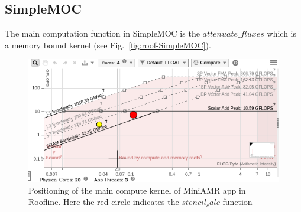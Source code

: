 \subsection{SimpleMOC}
The main computation function in SimpleMOC is the $attenuate\_fluxes$  which is a memory bound kernel (see Fig.~\ref{fig:roof-SimpleMOC}). 

\begin{figure}[h]%
\begin{center}
\includegraphics[width=1\linewidth]{MEMSYS22/figures/roofline/miniamr.png}
\end{center}
  \vspace{-0.1in}
\caption{Positioning of the main compute kernel of MiniAMR app in Roofline. Here the red circle indicates the $stencil_calc$ function }
\label{fig:roof-miniamr}
\vspace{-0.2in}
\end{figure}


%
%
%
%
%  
%
%
%


